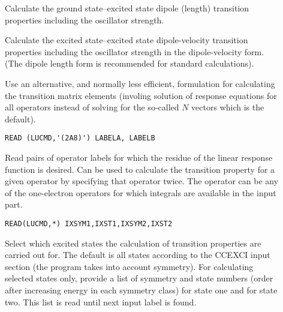 \begin{description}
\item[]

Calculate the ground state--excited state dipole (length) transition properties including
the oscillator strength.

\item[]

Calculate the excited state--excited state dipole-velocity  transition properties including
the oscillator strength in the dipole-velocity form. (The dipole length form is recommended
for standard calculations).

\item[]

Use an alternative, and normally less efficient, formulation for calculating
the transition matrix elements (involing solution of response equations for
all operators instead of solving for the so-called $N$ vectors which is the default).

\item[]

\noindent\verb|READ (LUCMD,'(2A8)') LABELA, LABELB|\newline

Read pairs of operator labels for which the residue of the linear response
function is desired.
Can be used to calculate the transition property for a given operator
by specifying that operator twice. The operator can be any of the one-electron
operators for which integrals are available in the  input part.



\item[]

\noindent\verb|READ(LUCMD,*) IXSYM1,IXST1,IXSYM2,IXST2|\newline 

Select which excited states the calculation of transition properties
are carried out for. The default is all states according to the CCEXCI input section
(the program takes into account symmetry). For calculating selected states only,
provide a list of symmetry and state numbers (order after increasing energy in
each symmetry class) for state one and for state two.
This list is read until next input label is found.


\end{description}

